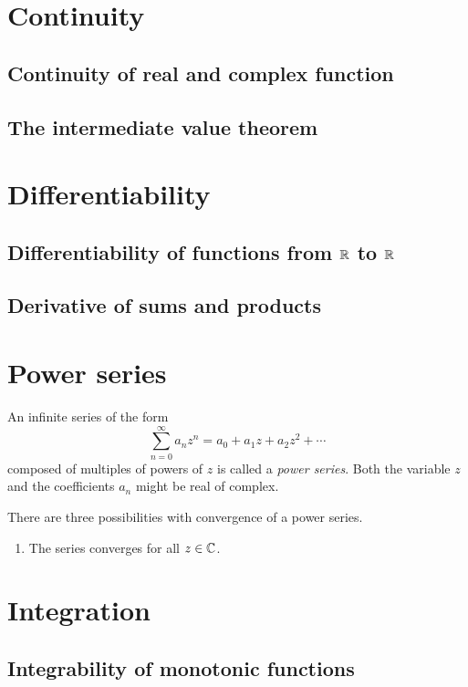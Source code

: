 \documentclass[main.tex]{subfiles}
\begin{document}
	\section{Continuity}
	\subsection{Continuity of real and complex function}
	
	\subsection{The intermediate value theorem}
	
	\section{Differentiability}
	\subsection{Differentiability of functions from $\mathbb R$ to $\mathbb R$}
	
	\subsection{Derivative of sums and products}
	
	\section{Power series}
	\begin{definition}
		An infinite series of the form
		\begin{equation*}
		\sum_{n = 0}^{\infty} a_n z^n = a_0 + a_1 z + a_2 z^2 + \cdots
		\end{equation*}
		composed of multiples of powers of $z$ is called a \textit{power series}. Both the variable $z$ and the coefficients $a_n$ might be real of complex.
	\end{definition}
	There are three possibilities with convergence of a power series.
	\begin{enumerate}
		\item The series converges for all $z \in \mathbb C$.
		
	\end{enumerate}
	
	
	
	\section{Integration}
	\subsection{Integrability of monotonic functions}
	
\end{document}
